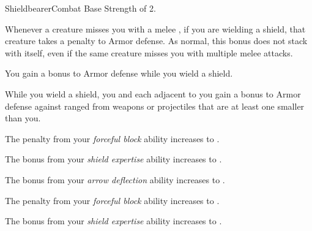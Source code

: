     \begin{feat}{Shieldbearer}{Combat}
        \featpre Base Strength of 2.

         Whenever a creature misses you with a melee , if you are wielding a shield, that creature  takes a  penalty to Armor defense.
        As normal, this bonus does not stack with itself, even if the same creature misses you with multiple melee attacks.

         You gain a  bonus to Armor defense while you wield a shield.

         While you wield a shield, you and each  adjacent to you gain a  bonus to Armor defense against ranged  from weapons or projectiles that are at least one  smaller than you.

         The penalty from your \textit{forceful block} ability increases to .

         The bonus from your \textit{shield expertise} ability increases to .

         The bonus from your \textit{arrow deflection} ability increases to .

         The penalty from your \textit{forceful block} ability increases to .

         The bonus from your \textit{shield expertise} ability increases to .
    \end{feat}

